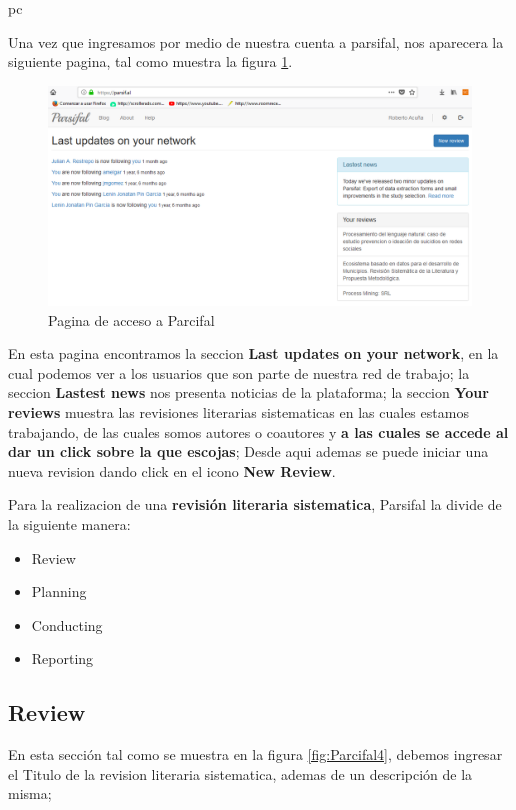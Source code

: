pc\documentclass[a4paper,12pt,openany]{book}
\begin{document}
\begin{itemize}
Una vez que ingresamos por medio de nuestra cuenta a parsifal, nos aparecera la siguiente pagina, tal como muestra la figura \ref{fig:Parcifal3}. 

        \begin{figure}[H]
        \centering
    	\includegraphics[width=12cm]{parsifal3.png}
        \caption{Pagina de acceso a Parcifal}
        \label{fig:Parcifal3}
        \end{figure}

En esta pagina encontramos la seccion \textbf{Last updates on your network}, en la cual podemos ver a los usuarios que son parte de nuestra red de trabajo; la seccion \textbf{Lastest news} nos presenta noticias de la plataforma; la seccion \textbf{Your reviews} muestra las revisiones literarias sistematicas en las cuales estamos trabajando, de las cuales somos autores o coautores y \textbf{a las cuales se accede al dar un click sobre la que escojas}; Desde aqui ademas se puede iniciar una nueva revision dando click en el icono \textbf{New Review}.

Para la realizacion de una \textbf{revisión literaria sistematica}, Parsifal la divide de la siguiente manera:

\begin{itemize}
\item Review
\item Planning
\item Conducting
\item Reporting
\end{itemize}

\subsection{Review}

En esta sección tal como se muestra en la figura \ref{fig:Parcifal4}, debemos ingresar el Titulo de la revision literaria sistematica, ademas de un descripción de la misma;


\end{itemize}
\end{document}
